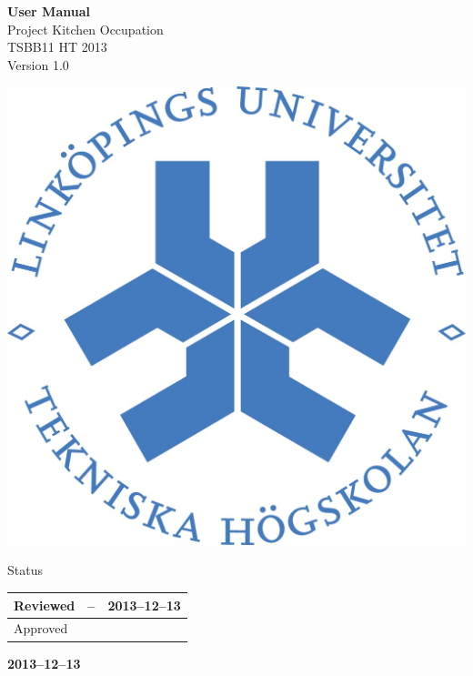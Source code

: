\documentclass[pdftex, fontsize=11pt, a4paper]{scrbook}
\begin{document}
\begin{titlepage}
\thispagestyle{empty}
\begin{center}
	\vspace*{4\baselineskip}

	\textbf{\huge User Manual} \\
	\vspace*{0.5\baselineskip}
	{\large  Project Kitchen Occupation} \\
	\vspace*{0.5\baselineskip}
	{\large  TSBB11 HT 2013} \\
	\vspace*{0.5\baselineskip}
	{\large  Version 1.0}


	\vspace*{6\baselineskip}
	\includegraphics[width=0.4\linewidth]{lith_sigill_col}


	\normalfont
	\small
	\vfill


	{\large  Status} \\
	\vspace*{1\baselineskip}
	\begin{tabular}{|p{4cm}|p{4cm}|p{4cm}|}
		\hline
		Reviewed & -- & 2013--12--13 \\
		\hline
		Approved &   &    \\
		\hline
	\end{tabular}


	\vspace*{2\baselineskip}

	\textbf{2013--12--13} \\
	[2\baselineskip]
\end{center}

\end{titlepage}
\end{document}
